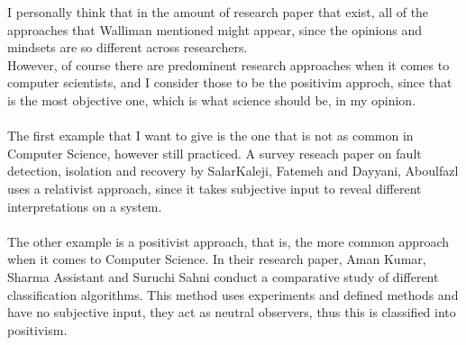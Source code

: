\documentclass[english]{report}
\begin{document}
I personally think that in the amount of research paper that exist, all of the approaches that Walliman mentioned might appear, since the opinions and mindsets are so different across researchers.\\
However, of course there are predominent research approaches when it comes to computer scientists, and I consider those to be the positivim approch, since that is the most objective one, which is what science should be, in my opinion.
\\\\
The first example that I want to give is the one that is not as common in Computer Science, however still practiced. A survey reseach paper on fault detection, isolation and recovery by SalarKaleji, Fatemeh and Dayyani, Aboulfazl uses a relativist approach, since it takes subjective input to reveal different interpretations on a system. \cite{survey}
\\\\
The other example is a positivist approach, that is, the more common approach when it comes to Computer Science. In their research paper, Aman Kumar, Sharma Assistant and Suruchi Sahni conduct a comparative study of different classification algorithms. This method uses experiments and defined methods and have no subjective input, they act as neutral observers, thus this is classified into positivism. \cite{class}


\renewcommand{\bibname}{References}

\end{document}
